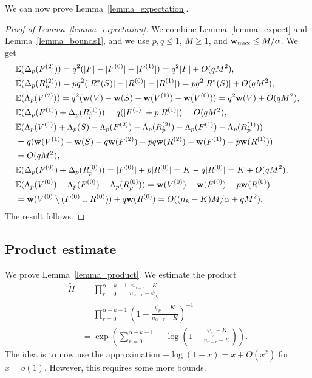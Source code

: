 \documentclass{article}
\theoremstyle{plain}
\theoremstyle{remark}
\theoremstyle{plain}
\numberwithin{equation}{section}
\renewcommand{\b}{{\bf{w}}}
\begin{document}
	We can now prove Lemma~\ref{lemma_expectation}.
	
	\begin{proof}[Proof of Lemma~\ref{lemma_expectation}]
		We combine Lemma~\ref{lemma_expect} and Lemma~\ref{lemma_bounds1}, and we use $p,q\leq1$, $M\geq1$, and $\b_{\max}\leq M/\alpha$. We get
		\begin{align}
			&\mathbb{E}(\Delta_p(F^{(2)}))=q^2(|F|-|F^{(0)}|-|F^{(1)}|)=q^2|F|+O(qM^2),
			\\&\mathbb{E}(\Delta_p(R^{(2)}_p))=pq^2(|R^*(S)|-|R^{(0)}|-|R^{(1)}|)=pq^2|R^*(S)|+O(qM^2),
			\\&\mathbb{E}(\Lambda_p(V^{(2)}))=q^2(\b(V)-\b(S)-\b(V^{(1)})-\b(V^{(0)}))=q^2\b(V)+O(qM^2),
			\\&\mathbb{E}(\Delta_p(F^{(1)})+\Delta_p(R^{(1)}_p))=q(|F^{(1)}|+p|R^{(1)}|)=O(qM^2),
			\\&\mathbb{E}(\Lambda_p(V^{(1)})+\Lambda_p(S)-\Lambda_p(F^{(2)})-\Lambda_p(R^{(2)}_p)-\Lambda_p(F^{(1)})-\Lambda_p(R^{(1)}_p))
			\\&=q(\b(V^{(1)})+\b(S)-q\b(F^{(2)})-pq\b(R^{(2)})-\b(F^{(1)})-p\b(R^{(1)}))
			\\&=O(qM^2),
			\\&\mathbb{E}(\Delta_p(F^{(0)})+\Delta_p(R^{(0)}_p))=|F^{(0)}|+p|R^{(0)}|=K-q|R^{(0)}|=K+O(qM^2),
			\\&\mathbb{E}(\Lambda_p(V^{(0)})-\Lambda_p(F^{(0)})-\Lambda_p(R^{(0)}_p))=\b(V^{(0)})-\b(F^{(0)})-p\b(R^{(0)})
			\\&=\b(V^{(0)}\setminus(F^{(0)}\cup R^{(0)}))+q\b(R^{(0)})=O((n_k-K)M/\alpha+qM^2).
		\end{align}
		The result follows.
	\end{proof}
	
	\subsection{Product estimate}\label{subsection_proof_product}
	
	We prove Lemma~\ref{lemma_product}. We estimate the product
	\begin{align}
		\widetilde\Pi&=\prod_{r=0}^{\alpha-k-1}\frac{n_{\alpha-r}-K}{n_{\alpha-r}-\psi_{p_r}}
		\\&=\prod_{r=0}^{\alpha-k-1}\left(1-\frac{\psi_{p_r}-K}{n_{\alpha-r}-K}\right)^{-1}
		\\&=\exp\left(\sum_{r=0}^{\alpha-k-1}-\log\left(1-\frac{\psi_{p_r}-K}{n_{\alpha-r}-K}\right)\right).
	\end{align}
	The idea is to now use the approximation $-\log(1-x)=x+O(x^2)$ for $x=o(1)$. However, this requires some more bounds.
	
\end{document}

